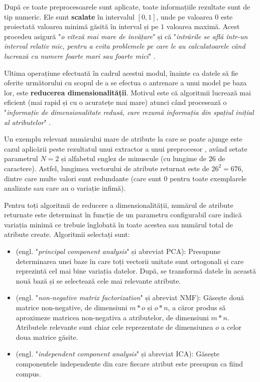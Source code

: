\documentclass[../../main.tex]{subfiles}
\begin{document}
După ce toate preprocesoarele sunt aplicate, toate informațiile rezultate sunt de tip numeric. Ele sunt \textbf{scalate} în intervalul $ [0, 1] $, unde pe valoarea $ 0 $ este proiectată valoarea minimă găsită în interval și pe $ 1 $ valoarea maximă. Acest procedeu asigură "\textit{o viteză mai mare de învățare}" și că "\textit{intrările se află într-un interval relativ mic, pentru a evita problemele pe care le au calculatoarele când lucrează cu numere foarte mari sau foarte mici}" \cite{hundred_page_ml}.

Ultima operațiune efectuată în cadrul acestui modul, înainte ca datele să fie oferite următorului cu scopul de a se efectua o antrenare a unui model pe baza lor, este \textbf{reducerea dimensionalității}. Motivul este că algoritmii lucrează mai eficient (mai rapid și cu o acuratețe mai mare) atunci când procesează o "\textit{informație de dimensionalitate redusă, care rezumă informația din spațiul inițial al atributelor}" \cite{ml_feature_engineering}.

Un exemplu relevant numărului mare de atribute la care se poate ajunge este cazul aplicării peste rezultatul unui extractor  a unui preprocesor , având setate parametrul $ N = 2 $ și alfabetul englez de minuscule (cu lungime de $ 26 $ de caractere). Astfel, lungimea vectorului de atribute returnat este de $ 26^2 = 676 $, dintre care multe valori sunt redundante (care sunt $ 0 $ pentru toate exemplarele analizate sau care au o variație infimă).

Pentru toți algoritmii de reducere a dimensionalității, numărul de atribute returnate este determinat în funcție de un parametru configurabil care indică variația minimă ce trebuie înglobată în toate acestea sau numărul total de atribute create. Algoritmii selectați sunt:

\begin{itemize}
    \item {} (engl. "\textit{principal component ana\-lysis}" și abreviat PCA): Presupune determinarea unei baze în care toți vectorii unitate sunt ortogonali și care reprezintă cel mai bine variația datelor. După, se transformă datele în această nouă bază și se selectează cele mai relevante atribute.
    \item {} (engl. "\textit{non-negative matrix factorization}" și abreviat NMF): Găsește două matrice non-negative, de dimensiuni $ m * o $ și $ o * n $, a căror produs să aproximeze matricea non-negativa a atributelor, de dimensiuni $ m * n $. Atributele relevante sunt chiar cele reprezentate de dimensiunea $ o $ a celor doua matrice găsite.
    \item {} (engl. "\textit{independent component analysis}" și abreviat ICA): Găsește componentele independente din care fiecare atribut este presupun ca fiind compus.
\end{itemize}
\end{document}
